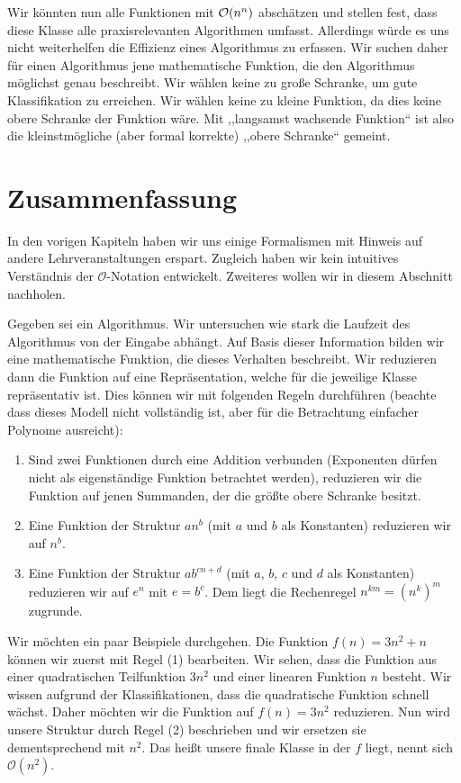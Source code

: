 Wir könnten nun alle Funktionen mit $\mathcal{O}\!\left(n^n\right)$ abschätzen und stellen fest, dass diese Klasse alle praxisrelevanten Algorithmen umfasst. Allerdings würde es uns nicht weiterhelfen die Effizienz eines Algorithmus zu erfassen. Wir suchen daher für einen Algorithmus jene mathematische Funktion, die den Algorithmus möglichst genau beschreibt. Wir wählen keine zu große Schranke, um gute Klassifikation zu erreichen. Wir wählen keine zu kleine Funktion, da dies keine obere Schranke der Funktion wäre. Mit ,,langsamst wachsende Funktion`` ist also die kleinstmögliche (aber formal korrekte) ,,obere Schranke`` gemeint.
%
\section{Zusammenfassung}
%
In den vorigen Kapiteln haben wir uns einige Formalismen mit Hinweis auf andere Lehrveranstaltungen erspart. Zugleich haben wir kein intuitives Verständnis der $\mathcal{O}$-Notation entwickelt. Zweiteres wollen wir in diesem Abschnitt nachholen.

Gegeben sei ein Algorithmus. Wir untersuchen wie stark die Laufzeit des Algorithmus von der Eingabe abhängt. Auf Basis dieser Information bilden wir eine mathematische Funktion, die dieses Verhalten beschreibt. Wir reduzieren dann die Funktion auf eine Repräsentation, welche für die jeweilige Klasse repräsentativ ist. Dies können wir mit folgenden Regeln durchführen (beachte dass dieses Modell nicht vollständig ist, aber für die Betrachtung einfacher Polynome ausreicht):
%
\begin{enumerate}
  \item Sind zwei Funktionen durch eine Addition verbunden (Exponenten dürfen nicht als eigenständige Funktion betrachtet werden), reduzieren wir die Funktion auf jenen Summanden, der die größte obere Schranke besitzt.
  \item Eine Funktion der Struktur $an^{b}$ (mit $a$ und $b$ als Konstanten) reduzieren wir auf $n^b$.
  \item Eine Funktion der Struktur $ab^{cn + d}$ (mit $a$, $b$, $c$ und $d$ als Konstanten) reduzieren wir auf $e^n$ mit $e=b^c$. Dem liegt die Rechenregel $n^{km} = {(n^k)}^m$ zugrunde.
\end{enumerate}

Wir möchten ein paar Beispiele durchgehen. Die Funktion $f(n) = 3n^2 + n$ können wir zuerst mit Regel (1) bearbeiten. Wir sehen, dass die Funktion aus einer quadratischen Teilfunktion $3n^2$ und einer linearen Funktion $n$ besteht. Wir wissen aufgrund der Klassifikationen, dass die quadratische Funktion schnell wächst. Daher möchten wir die Funktion auf $f(n) = 3n^2$ reduzieren. Nun wird unsere Struktur durch Regel (2) beschrieben und wir ersetzen sie dementsprechend mit $n^2$. Das heißt unsere finale Klasse in der $f$ liegt, nennt sich $\mathcal{O}(n^2)$.


